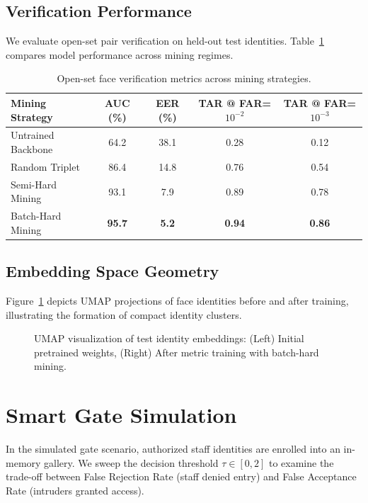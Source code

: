 \documentclass{article}
\begin{document}
\subsection{Verification Performance}
We evaluate open-set pair verification on held-out test identities. Table~\ref{tab:verification_metrics} compares model performance across mining regimes.

\begin{table}[h]
  \caption{Open-set face verification metrics across mining strategies.}
  \label{tab:verification_metrics}
  \centering
  \begin{tabular}{lcccc}
    \toprule
    Mining Strategy & AUC (\%) & EER (\%) & TAR @ FAR=$10^{-2}$ & TAR @ FAR=$10^{-3}$ \\
    \midrule
    Untrained Backbone & 64.2 & 38.1 & 0.28 & 0.12 \\
    Random Triplet     & 86.4 & 14.8 & 0.76 & 0.54 \\
    Semi-Hard Mining   & 93.1 & 7.9  & 0.89 & 0.78 \\
    Batch-Hard Mining  & \textbf{95.7} & \textbf{5.2}  & \textbf{0.94} & \textbf{0.86} \\
    \bottomrule
  \end{tabular}
\end{table}

\subsection{Embedding Space Geometry}
Figure~\ref{fig:embeddings} depicts UMAP projections of face identities before and after training, illustrating the formation of compact identity clusters.

\begin{figure}[h]
  \centering
  \fbox{\rule[-.5cm]{0cm}{4cm} \rule[-.5cm]{11cm}{0cm}} %
  \caption{UMAP visualization of test identity embeddings: (Left) Initial pretrained weights, (Right) After metric training with batch-hard mining.}
  \label{fig:embeddings}
\end{figure}

\section{Smart Gate Simulation}
\label{sec:smartgate}
In the simulated gate scenario, authorized staff identities are enrolled into an in-memory gallery. We sweep the decision threshold $\tau \in [0, 2]$ to examine the trade-off between False Rejection Rate (staff denied entry) and False Acceptance Rate (intruders granted access).
\end{document}
